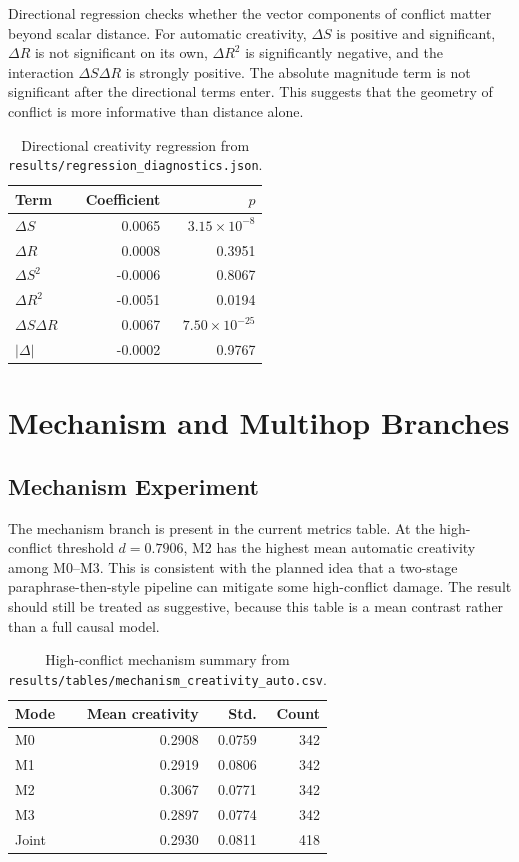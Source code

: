 \documentclass[sigconf,nonacm]{acmart}
\begin{document}
Directional regression checks whether the vector components of conflict matter beyond scalar distance.
For automatic creativity, $\Delta S$ is positive and significant, $\Delta R$ is not significant on its own, $\Delta R^2$ is significantly negative, and the interaction $\Delta S\Delta R$ is strongly positive.
The absolute magnitude term is not significant after the directional terms enter.
This suggests that the geometry of conflict is more informative than distance alone.

\begin{table}[t]
\centering
\small
\begin{tabular}{lrr}
\toprule
Term & Coefficient & $p$ \\
\midrule
$\Delta S$ & 0.0065 & $3.15{\times}10^{-8}$ \\
$\Delta R$ & 0.0008 & 0.3951 \\
$\Delta S^2$ & -0.0006 & 0.8067 \\
$\Delta R^2$ & -0.0051 & 0.0194 \\
$\Delta S\Delta R$ & 0.0067 & $7.50{\times}10^{-25}$ \\
$|\Delta|$ & -0.0002 & 0.9767 \\
\bottomrule
\end{tabular}
\caption{Directional creativity regression from \texttt{results/regression\_diagnostics.json}.}
\label{tab:direction}
\end{table}

\section{Mechanism and Multihop Branches}

\subsection{Mechanism Experiment}

The mechanism branch is present in the current metrics table.
At the high-conflict threshold $d=0.7906$, M2 has the highest mean automatic creativity among M0--M3.
This is consistent with the planned idea that a two-stage paraphrase-then-style pipeline can mitigate some high-conflict damage.
The result should still be treated as suggestive, because this table is a mean contrast rather than a full causal model.

\begin{table}[t]
\centering
\small
\begin{tabular}{lrrr}
\toprule
Mode & Mean creativity & Std. & Count \\
\midrule
M0 & 0.2908 & 0.0759 & 342 \\
M1 & 0.2919 & 0.0806 & 342 \\
M2 & 0.3067 & 0.0771 & 342 \\
M3 & 0.2897 & 0.0774 & 342 \\
Joint & 0.2930 & 0.0811 & 418 \\
\bottomrule
\end{tabular}
\caption{High-conflict mechanism summary from \texttt{results/tables/mechanism\_creativity\_auto.csv}.}
\label{tab:mechanism}
\end{table}
\end{document}
